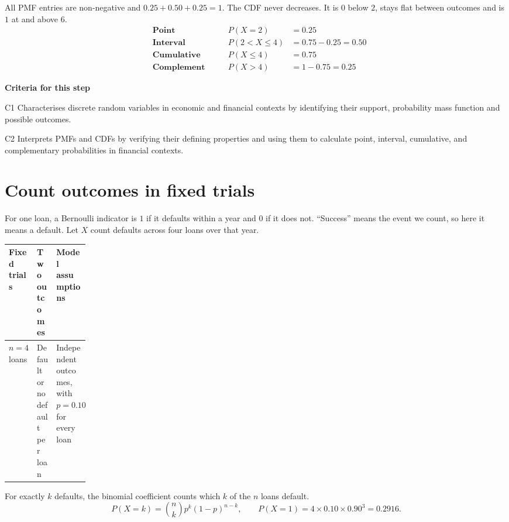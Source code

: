 All PMF entries are non-negative and \(0.25+0.50+0.25=1\). The CDF never decreases. It is \(0\) below \(2\), stays flat between outcomes and is \(1\) at and above \(6\).
\[
\begin{alignedat}{2}
&\textbf{Point}      &\qquad P(X=2)     &=0.25\\
&\textbf{Interval}   &\qquad P(2<X\leq 4) &=0.75-0.25=0.50\\
&\textbf{Cumulative} &\qquad P(X\leq 4)   &=0.75\\
&\textbf{Complement} &\qquad P(X>4)       &=1-0.75=0.25
\end{alignedat}
\]

\textbf{Criteria for this step}
\begin{stepcriteria}
\item[C1] Characterises discrete random variables in economic and financial contexts by identifying their support, probability mass function and possible outcomes.
\item[C2] Interprets PMFs and CDFs by verifying their defining properties and using them to calculate point, interval, cumulative, and complementary probabilities in financial contexts.
\end{stepcriteria}

\clearpage
\section{Count outcomes in fixed trials}

For one loan, a Bernoulli indicator is \(1\) if it defaults within a year and \(0\) if it does not. “Success” means the event we count, so here it means a default. Let \(X\) count defaults across four loans over that year.


\noindent
\begin{tabularx}{\linewidth}{@{}R{0.16\linewidth} L L@{}}
\toprule
\textbf{Fixed trials} & \textbf{Two outcomes} & \textbf{Model assumptions}\\
\midrule
\(n=4\) loans & Default or no default per loan & Independent outcomes, with \(p=0.10\) for every loan\\
\bottomrule
\end{tabularx}

For exactly \(k\) defaults, the binomial coefficient counts which \(k\) of the \(n\) loans default.
\[
P(X=k)=\binom{n}{k}p^k(1-p)^{n-k},
\qquad P(X=1)=4\times 0.10\times 0.90^3=0.2916.
\]

